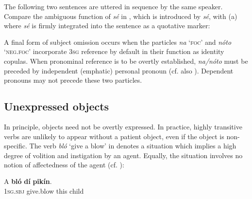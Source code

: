 The following two sentences are uttered in sequence by the same speaker. Compare the ambiguous function of \textit{sé} in , which is introduced by \textit{sé}, with (a) where \textit{sé} is firmly integrated into the sentence as a quotative marker:



\ea%
    \label{ex:key:1271}
\z\z

A final form of subject omission occurs when the particles \textit{na} ‘\textsc{foc}’ and \textit{nóto} ‘\textsc{neg}.\textsc{foc}’ incorporate \textsc{3sg} reference by default in their function as identity copulas. When pronominal reference is to be overtly established, \textit{na}\textit{\textup{/}}\textit{nóto} must be preceded by independent (emphatic) personal pronoun (cf. also ). Dependent pronouns may not precede these two particles.

\subsection{Unexpressed objects}\label{sec:9.4.2}

In principle, objects need not be overtly expressed. In practice, highly transitive verbs are unlikely to appear without a patient object, even if the object is non-specific. The verb \textit{bló} ‘give a blow’ in  denotes a situation which implies a high degree of volition and instigation by an agent. Equally, the situation involves no notion of affectedness of the agent (cf. \citealt{Naess2007}):


\ea%
    \label{ex:key:1272}
    \gll A    \textbf{bló}      \textbf{dí}  \textbf{pikín}.\\
\textsc{1sg.sbj}  give.blow  this  child\\

